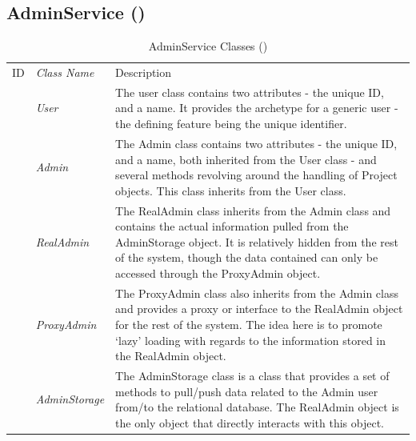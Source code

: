 \documentclass[12pt,letterpaper]{article}
\begin{document}
\subsection{AdminService ()}
\begin{table}[H]
	\caption{AdminService Classes ()} 
	\begin{tabu} to 
	    \tableheader{}ID & Class Name & Description \\
		 & User & The user class contains two attributes - the unique ID, and a name. It provides the archetype for a generic user - the defining feature being the unique identifier.\\
		 & Admin & The Admin class contains two attributes - the unique ID, and a name, both inherited from the User class - and several methods revolving around the handling of Project objects. This class inherits from the User class. \\
		 & RealAdmin & The RealAdmin class inherits from the Admin class and contains the actual information pulled from the AdminStorage object. It is relatively hidden from the rest of the system, though the data contained can only be accessed through the ProxyAdmin object. \\
		 & ProxyAdmin & The ProxyAdmin class also inherits from the Admin class and provides a proxy or interface to the RealAdmin object for the rest of the system. The idea here is to promote `lazy' loading with regards to the information stored in the RealAdmin object.\\
		 & AdminStorage & The AdminStorage class is a class that provides a set of methods to pull/push data related to the Admin user from/to the relational database. The RealAdmin object is the only object that directly interacts with this object.\\
	\end{tabu}
\end{table}
\end{document}
